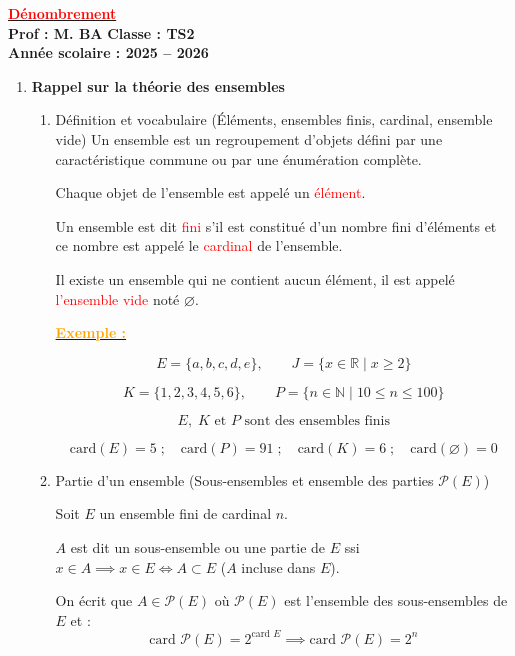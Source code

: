 \documentclass[12pt,a4paper]{article}
\newcounter{exemple}
\newcommand{\exemple}{
\refstepcounter{exemple}
\textbf{\textcolor{orange}{Exemple \theexemple : }}
}
\begin{document}
\begin{center}
    \Large\textbf{\underline{\textcolor{red}{Dénombrement}}}\\[-0.1cm]
    \normalsize\textbf{Prof : M. BA} \hfill \textbf{Classe : TS2}\\[-0.1cm]
    \textbf{Année scolaire : 2025 -- 2026}
\end{center}

\begin{enumerate}[label=\Roman*., font=\bfseries\color{red}]
    \item \textbf{Rappel sur la théorie des ensembles}
    \begin{enumerate}
        \item Définition et vocabulaire (Éléments, ensembles finis, cardinal, ensemble vide)
        Un ensemble est un regroupement d'objets défini par une caractéristique commune ou par une énumération complète.

Chaque objet de l'ensemble est appelé un \textcolor{red}{élément}.

Un ensemble est dit \textcolor{red}{fini} s'il est constitué d'un nombre fini d'éléments et ce nombre est appelé le \textcolor{red}{cardinal} de l'ensemble.

Il existe un ensemble qui ne contient aucun élément, il est appelé \textcolor{red}{l'ensemble vide} noté $\varnothing$.

\textbf{\underline{\exemple}}

\[
E=\{a,b,c,d,e\}, \qquad 
J=\{x\in\mathbb{R}\mid x\geq 2\}
\]

\[
K=\{1,2,3,4,5,6\}, \qquad 
P=\{n\in\mathbb{N}\mid 10\leq n\leq100\}
\]

\[
E,\;K \text{ et } P \text{ sont des ensembles finis}
\]

\[
\mathrm{card}(E)=5 \;;\quad 
\mathrm{card}(P)=91 \;;\quad 
\mathrm{card}(K)=6 \;;\quad 
\mathrm{card}(\varnothing)=0
\]
        \item Partie d'un ensemble (Sous-ensembles et ensemble des parties $\mathcal{P}(E)$)

Soit $E$ un ensemble fini de cardinal $n$.

$A$ est dit un sous-ensemble ou une partie de $E$ ssi $x \in A \implies x \in E \iff A \subset E$ ($A$ incluse dans $E$). 

On écrit que $A \in \mathcal{P}(E)$ où $\mathcal{P}(E)$ est l'ensemble des sous-ensembles de $E$ et :
\[ \text{card } \mathcal{P}(E) = 2^{\text{card } E} \implies \text{card } \mathcal{P}(E) = 2^n \]


\end{enumerate}
\end{enumerate}
\end{document}

